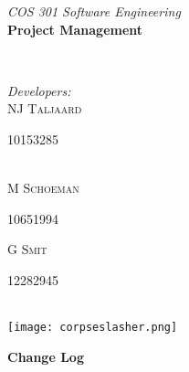 \documentclass[letterpaper]{article}
\makeatletter
\def\printauthor{%
    {\large \@author}}
\makeatother
\begin{document}
\begin{titlepage}
\begin{center}
\begin{minipage}{0.4\textwidth}
\begin{flushleft} \large
\emph{COS 301 Software Engineering}\\
\vspace{1cm}\textbf{Project Management}
\end{flushleft}
\end{minipage}
~
\begin{minipage}{0.4\textwidth}
	\begin{flushright} \large
	\emph{Developers:} \\
		NJ \textsc{Taljaard} \\
			\begin{small}
				10153285
			\end{small} \\
		M  \textsc{Schoeman} \\
			\begin{small}
				10651994 \\
			\end{small}
		G  \textsc{Smit} \\
			\begin{small}
				12282945
			\end{small}
	\end{flushright}
\end{minipage}\\



\texttt{[image: corpseslasher.png]}\\ %
 
\end{center}
\vfill %

\end{titlepage}
	\newpage
	{\LARGE \bf Change Log}\\[2em]
	
\end{document}
